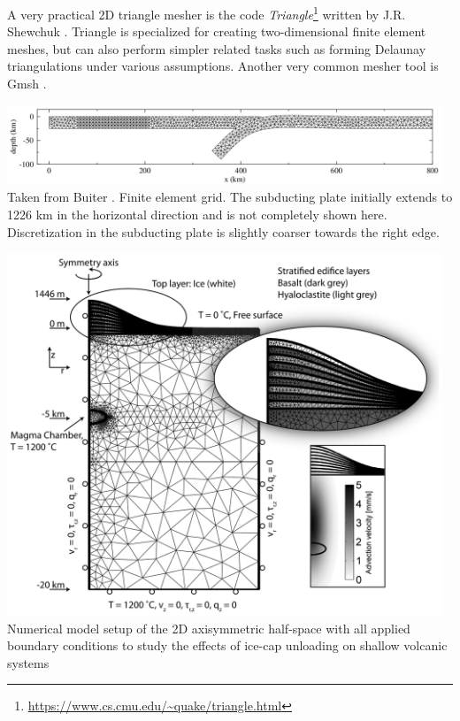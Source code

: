 A very practical 2D triangle mesher is the 
code {\sl Triangle}\footnote{\url{https://www.cs.cmu.edu/~quake/triangle.html}}
written by J.R. Shewchuk \cite{shew96,shew02,shew14}.
Triangle is specialized for creating two-dimensional finite element meshes, but can 
also perform simpler related tasks such as forming Delaunay triangulations under various assumptions.
Another very common mesher tool is Gmsh \cite{gere09}.

\begin{center}
\includegraphics[width=13cm]{images/meshes/bugw01}\\
{\captionfont Taken from Buiter \etal \cite{bugw01}. Finite element grid. 
The subducting plate initially extends to 1226 km in the horizontal direction and 
is not completely shown here. Discretization in the subducting plate is slightly coarser 
towards the right edge.}
\end{center}

\begin{center}
\includegraphics[width=13cm]{images/meshes/bafl16}\\
{\captionfont Numerical model setup of the 2D axisymmetric half-space with all applied 
boundary conditions to study the effects of ice-cap unloading
on shallow volcanic systems \cite{bafl16}}
\end{center}

